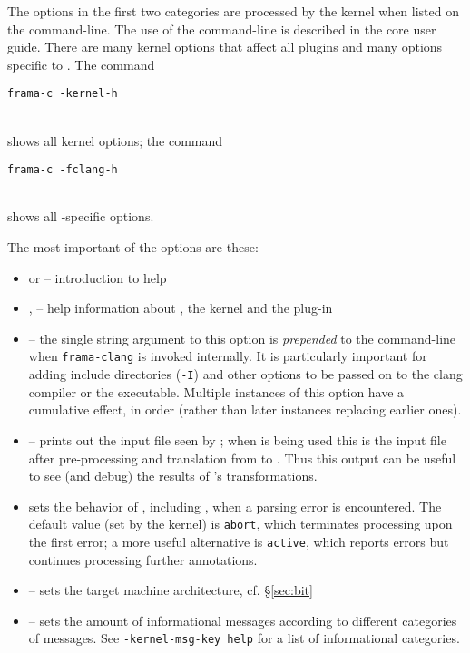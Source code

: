 The options in the first two categories are processed by the \fc kernel when listed on the \fc command-line. 
The use of the \fc command-line is described in the core \fc 
user guide.
There are many kernel options that affect all plugins and many options specific to \fclang.
The command \\
\centerline{\lstinline|frama-c -kernel-h|} \\
shows all kernel options; the command\\
\centerline{\lstinline|frama-c -fclang-h|} \\
shows all \fcl-specific options.

The most important of the options are these:
\begin{itemize}
\item {}  or  -- introduction to \framac help
    \item {},  -- help information about \fc, the \fc kernel and the \fcl plug-in
	\item {} -- the single string argument to this option is \textit{prepended} to the command-line when 
	\lstinline|frama-clang| is invoked internally. It is particularly 
	important for adding include directories (\lstinline|-I|) and
	other options to be passed on to the clang compiler or the \irg executable. 
	Multiple instances of this option have a cumulative effect, in order (rather
	than later instances replacing earlier ones).
    \item {} -- prints out the input file seen by \fc; when \fcl is being used this is the input file after pre-processing and translation from \cpp to \C. Thus this output can be useful to see (and debug) the results of \fcl's transformations.
    \item {} sets the behavior of \framac, including \fclang, when a parsing error is encountered. The default value (set by the kernel) is \texttt{abort}, which terminates processing upon the first error; a more useful alternative is \texttt{active}, which reports errors but continues processing further annotations.
	\item {} -- sets the target machine architecture, cf. \S\ref{sec:bit}
	\item {} -- sets the amount of informational messages according to different categories of messages.
See \lstinline|-kernel-msg-key help| for a list of informational categories.

\end{itemize}
